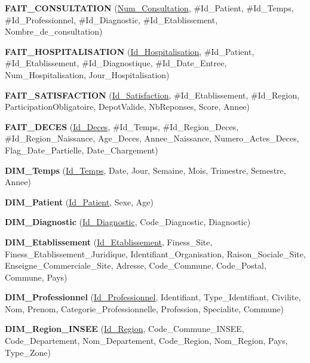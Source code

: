 {\small\raggedright
\noindent \textbf{FAIT\_\allowbreak CONSULTATION} (\underline{Num\_\allowbreak Consultation}, \#Id\_\allowbreak Patient, \#Id\_\allowbreak Temps, \#Id\_\allowbreak Professionnel, \#Id\_\allowbreak Diagnostic, \#Id\_\allowbreak Etablissement, Nombre\_\allowbreak de\_\allowbreak consultation)

\noindent \textbf{FAIT\_\allowbreak HOSPITALISATION} (\underline{Id\_\allowbreak Hospitalisation}, \#Id\_\allowbreak Patient, \#Id\_\allowbreak Etablissement, \#Id\_\allowbreak Diagnostique, \#Id\_\allowbreak Date\_\allowbreak Entree, Num\_\allowbreak Hospitalisation, Jour\_\allowbreak Hospitalisation)

\noindent \textbf{FAIT\_\allowbreak SATISFACTION} (\underline{Id\_\allowbreak Satisfaction}, \#Id\_\allowbreak Etablissement, \#Id\_\allowbreak Region, ParticipationObligatoire, DepotValide, NbReponses, Score, Annee)

\noindent \textbf{FAIT\_\allowbreak DECES} (\underline{Id\_\allowbreak Deces}, \#Id\_\allowbreak Temps, \#Id\_\allowbreak Region\_\allowbreak Deces, \#Id\_\allowbreak Region\_\allowbreak Naissance, Age\_\allowbreak Deces, Annee\_\allowbreak Naissance, Numero\_\allowbreak Actes\_\allowbreak Deces, Flag\_\allowbreak Date\_\allowbreak Partielle, Date\_\allowbreak Chargement)

\noindent \textbf{DIM\_\allowbreak Temps} (\underline{Id\_\allowbreak Temps}, Date, Jour, Semaine, Mois, Trimestre, Semestre, Annee)

\noindent \textbf{DIM\_\allowbreak Patient} (\underline{Id\_\allowbreak Patient}, Sexe, Age)

\noindent \textbf{DIM\_\allowbreak Diagnostic} (\underline{Id\_\allowbreak Diagnostic}, Code\_\allowbreak Diagnostic, Diagnostic)

\noindent \textbf{DIM\_\allowbreak Etablissement} (\underline{Id\_\allowbreak Etablissement}, Finess\_\allowbreak Site, Finess\_\allowbreak Etablissement\_\allowbreak Juridique, Identifiant\_\allowbreak Organisation, Raison\_\allowbreak Sociale\_\allowbreak Site, Enseigne\_\allowbreak Commerciale\_\allowbreak Site, Adresse, Code\_\allowbreak Commune, Code\_\allowbreak Postal, Commune, Pays)

\noindent \textbf{DIM\_\allowbreak Professionnel} (\underline{Id\_\allowbreak Professionnel}, Identifiant, Type\_\allowbreak Identifiant, Civilite, Nom, Prenom, Categorie\_\allowbreak Professionnelle, Profession, Specialite, Commune)

\noindent \textbf{DIM\_\allowbreak Region\_\allowbreak INSEE} (\underline{Id\_\allowbreak Region}, Code\_\allowbreak Commune\_\allowbreak INSEE, Code\_\allowbreak Departement, Nom\_\allowbreak Departement, Code\_\allowbreak Region, Nom\_\allowbreak Region, Pays, Type\_\allowbreak Zone)
\par}

